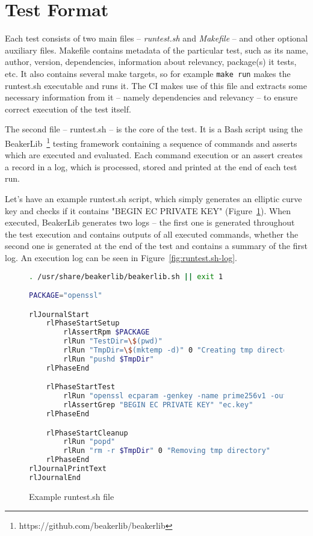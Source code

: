 \section{Test Format}
    Each test consists of two main files -- \textit{runtest.sh} and \textit{Makefile}
    -- and other optional auxiliary files. Makefile contains metadata of the
    particular test, such as its name, author, version, dependencies, information
    about relevancy, package(s) it tests, etc. It also contains several make
    targets, so for example \texttt{make run} makes the runtest.sh executable
    and runs it. The CI makes use of this file and extracts some necessary
    information from it -- namely dependencies and relevancy -- to ensure
    correct execution of the test itself.

    The second file -- runtest.sh -- is the core of the test. It is a Bash
    script using the BeakerLib~\footnote{https://github.com/beakerlib/beakerlib}
    testing framework containing a sequence of commands and asserts which
    are executed and evaluated. Each command execution or an assert
    creates a record in a log, which is processed, stored and printed at the end of
    each test run.

    Let's have an example runtest.sh script, which simply generates an elliptic
    curve key and checks if it contains "BEGIN EC PRIVATE KEY"
    (Figure~\ref{fig:runtest.sh}). When executed, BeakerLib generates two
    logs -- the first one is generated throughout the test execution and contains
    outputs of all executed commands, whether the second one is generated at
    the end of the test and contains a summary of the first log. An execution
    log can be seen in Figure~\ref{fig:runtest.sh-log}.

    \begin{figure}
        \begin{lstlisting}[language=Bash,basicstyle=\small]
. /usr/share/beakerlib/beakerlib.sh || exit 1

PACKAGE="openssl"

rlJournalStart
    rlPhaseStartSetup
        rlAssertRpm $PACKAGE
        rlRun "TestDir=\$(pwd)"
        rlRun "TmpDir=\$(mktemp -d)" 0 "Creating tmp directory"
        rlRun "pushd $TmpDir"
    rlPhaseEnd

    rlPhaseStartTest
        rlRun "openssl ecparam -genkey -name prime256v1 -out ec.key"
        rlAssertGrep "BEGIN EC PRIVATE KEY" "ec.key"
    rlPhaseEnd

    rlPhaseStartCleanup
        rlRun "popd"
        rlRun "rm -r $TmpDir" 0 "Removing tmp directory"
    rlPhaseEnd
rlJournalPrintText
rlJournalEnd
        \end{lstlisting}
        \caption{Example runtest.sh file} \label{fig:runtest.sh}
    \end{figure}

